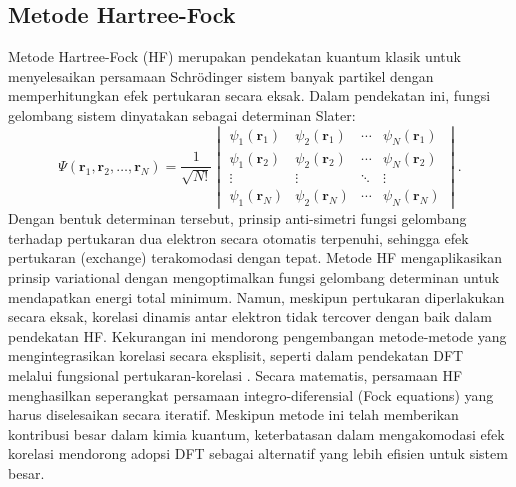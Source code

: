 \subsection{Metode Hartree-Fock}
Metode Hartree-Fock (HF) merupakan pendekatan kuantum klasik untuk menyelesaikan persamaan Schrödinger sistem banyak partikel dengan memperhitungkan efek pertukaran secara eksak.
Dalam pendekatan ini, fungsi gelombang sistem dinyatakan sebagai determinan Slater:
\begin{equation}
    \Psi(\mathbf{r}_1,\mathbf{r}_2,\ldots,\mathbf{r}_N) = \frac{1}{\sqrt{N!}}
    \begin{vmatrix}
    \psi_1(\mathbf{r}_1) & \psi_2(\mathbf{r}_1) & \cdots & \psi_N(\mathbf{r}_1) \\
    \psi_1(\mathbf{r}_2) & \psi_2(\mathbf{r}_2) & \cdots & \psi_N(\mathbf{r}_2) \\
    \vdots & \vdots & \ddots & \vdots \\
    \psi_1(\mathbf{r}_N) & \psi_2(\mathbf{r}_N) & \cdots & \psi_N(\mathbf{r}_N)
    \end{vmatrix}.
\end{equation}
Dengan bentuk determinan tersebut, prinsip anti-simetri fungsi gelombang terhadap pertukaran dua elektron secara otomatis terpenuhi, sehingga efek pertukaran (exchange) terakomodasi dengan tepat.
Metode HF mengaplikasikan prinsip variational dengan mengoptimalkan fungsi gelombang determinan untuk mendapatkan energi total minimum.
Namun, meskipun pertukaran diperlakukan secara eksak, korelasi dinamis antar elektron tidak tercover dengan baik dalam pendekatan HF.
Kekurangan ini mendorong pengembangan metode-metode yang mengintegrasikan korelasi secara eksplisit, seperti dalam pendekatan DFT melalui fungsional pertukaran-korelasi \cite{Martin2004}.
Secara matematis, persamaan HF menghasilkan seperangkat persamaan integro-diferensial (Fock equations) yang harus diselesaikan secara iteratif.
Meskipun metode ini telah memberikan kontribusi besar dalam kimia kuantum, keterbatasan dalam mengakomodasi efek korelasi mendorong adopsi DFT sebagai alternatif yang lebih efisien untuk sistem besar.

